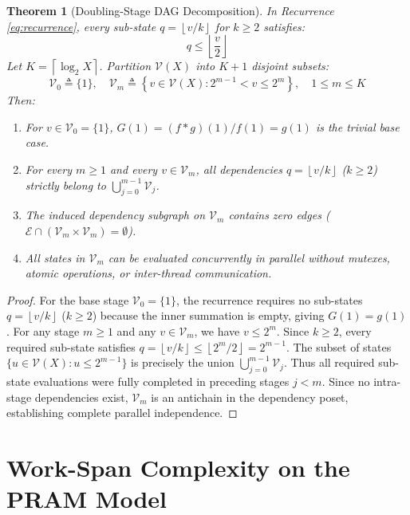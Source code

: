 \documentclass[11pt,a4paper]{article}
\theoremstyle{plain}
\newtheorem{theorem}{Theorem}[section]
\theoremstyle{definition}
\newcommand{\V}{\mathcal{V}}
\newcommand{\floor}[1]{\left\lfloor #1 \right\rfloor}
\newcommand{\ceil}[1]{\left\lceil #1 \right\rceil}
\begin{document}
\begin{theorem}[Doubling-Stage DAG Decomposition]
\label{thm:dag}
In Recurrence \eqref{eq:recurrence}, every sub-state $q = \floor{v/k}$ for $k \ge 2$ satisfies:
\begin{equation}
    q \le \floor{\frac{v}{2}}
\end{equation}
Let $K = \ceil{\log_2 X}$. Partition $\V(X)$ into $K+1$ disjoint subsets:
\begin{equation}
    \V_0 \triangleq \{1\}, \quad \V_m \triangleq \left\{ v \in \V(X) : 2^{m-1} < v \le 2^m \right\}, \quad 1 \le m \le K
\end{equation}
Then:
\begin{enumerate}
    \item For $v \in \V_0 = \{1\}$, $G(1) = (f*g)(1)/f(1) = g(1)$ is the trivial base case.
    \item For every $m \ge 1$ and every $v \in \V_m$, all dependencies $q = \floor{v/k}$ ($k \ge 2$) strictly belong to $\bigcup_{j=0}^{m-1} \V_j$.
    \item The induced dependency subgraph on $\V_m$ contains zero edges ($\mathcal{E} \cap (\V_m \times \V_m) = \emptyset$).
    \item All states in $\V_m$ can be evaluated concurrently in parallel without mutexes, atomic operations, or inter-thread communication.
\end{enumerate}
\end{theorem}

\begin{proof}
For the base stage $\V_0 = \{1\}$, the recurrence requires no sub-states $q = \floor{v/k}$ ($k \ge 2$) because the inner summation is empty, giving $G(1) = g(1)$. For any stage $m \ge 1$ and any $v \in \V_m$, we have $v \le 2^m$. Since $k \ge 2$, every required sub-state satisfies $q = \floor{v/k} \le \floor{2^m / 2} = 2^{m-1}$. The subset of states $\{u \in \V(X) : u \le 2^{m-1}\}$ is precisely the union $\bigcup_{j=0}^{m-1} \V_j$. Thus all required sub-state evaluations were fully completed in preceding stages $j < m$. Since no intra-stage dependencies exist, $\V_m$ is an antichain in the dependency poset, establishing complete parallel independence.
\end{proof}


\section{Work-Span Complexity on the PRAM Model}
\label{sec:complexity}
\end{document}
